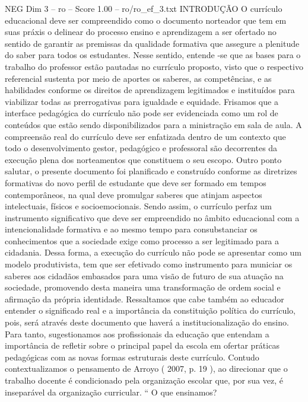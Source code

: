 \begin{textsample}{NEG Dim 3 – ro – Score 1.00 – ro/ro\_ef\_3.txt}  \label{ex:f3_neg_156}
INTRODUÇÃO O currículo educacional deve ser compreendido como o documento norteador que tem em suas práxis o delinear do processo ensino e aprendizagem a ser ofertado no sentido de garantir as premissas da qualidade formativa que assegure a plenitude do saber para todos os estudantes.
Nesse sentido, entende -se que as bases para o trabalho do professor estão pautadas no currículo proposto, visto que o respectivo referencial sustenta por meio de aportes os saberes, as competências, e as habilidades conforme os direitos de aprendizagem legitimados e instituídos para viabilizar todas as prerrogativas para igualdade e equidade.
Frisamos que a interface pedagógica do currículo não pode ser evidenciada como um rol de conteúdos que estão sendo disponibilizados para a ministração em sala de aula.
A compreensão real do currículo deve ser enfatizada dentro de um contexto que todo o desenvolvimento gestor, pedagógico e professoral são decorrentes da execução plena dos norteamentos que constituem o seu escopo.
Outro ponto salutar, o presente documento foi planificado e construído conforme as diretrizes formativas do novo perfil de estudante que deve ser formado em tempos contemporâneos, na qual deve promulgar saberes que atinjam aspectos intelectuais, físicos e socioemocionais.
Sendo assim, o currículo perfaz um instrumento significativo que deve ser empreendido no âmbito educacional com a intencionalidade formativa e ao mesmo tempo para consubstanciar os conhecimentos que a sociedade exige como processo a ser legitimado para a cidadania.
Dessa forma, a execução do currículo não pode se apresentar como um modelo produtivista, tem que ser efetivado como instrumento para municiar os saberes aos cidadãos embasados para uma visão de futuro de sua atuação na sociedade, promovendo desta maneira uma transformação de ordem social e afirmação da própria identidade.
Ressaltamos que cabe também ao educador entender o significado real e a importância da constituição política do currículo, pois, será através deste documento que haverá a institucionalização do ensino.
Para tanto, sugestionamos aos profissionais da educação que entendam a importância de refletir sobre o principal papel da escola em ofertar práticas pedagógicas com as novas formas estruturais deste currículo.
Contudo contextualizamos o pensamento de Arroyo ( 2007, p. 19 ), ao direcionar que o trabalho docente é condicionado pela organização escolar que, por sua vez, é inseparável da organização curricular. “ O que ensinamos?

\end{textsample}
